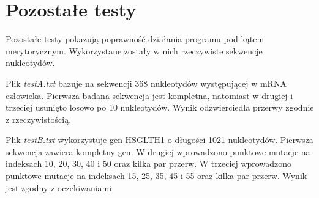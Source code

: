 \documentclass[a4paper,12pt,oneside,notitlepage,onecolumn]{article}
\begin{document}
\section{Pozostałe testy}
Pozostałe testy pokazują poprawność działania programu pod kątem merytorycznym.
Wykorzystane zostały w nich rzeczywiste sekwencje nukleotydów.

Plik \emph{testA.txt} bazuje na sekwencji 368 nukleotydów występującej w mRNA człowieka.
Pierwsza badana sekwencja jest kompletna, natomiast w drugiej i trzeciej usunięto losowo po 10 nukleotydów.
Wynik odzwierciedla przerwy zgodnie z rzeczywistością.

Plik \emph{testB.txt} wykorzystuje gen HSGLTH1 o długości 1021 nukleotydów.
Pierwsza sekwencja zawiera kompletny gen.
W drugiej wprowadzono punktowe mutacje na indeksach 10, 20, 30, 40 i 50 oraz kilka par przerw.
W trzeciej wprowadzono punktowe mutacje na indeksach 15, 25, 35, 45 i 55 oraz kilka par przerw.
Wynik jest zgodny z oczekiwaniami
\end{document}
